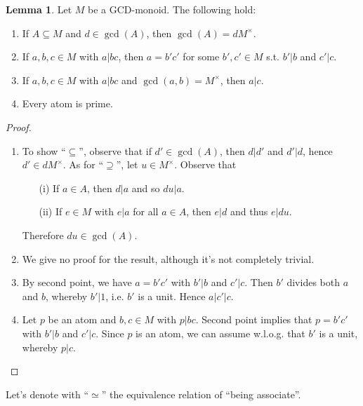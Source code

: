 \documentclass[12pt,a4paper]{report}
\theoremstyle{definition}
\newtheorem{lemma}[theorem]{Lemma}
\theoremstyle{num.custom-title}
\DeclareMathOperator{\sse}{\subseteq}
\begin{document}
\begin{lemma}\label{lemma_gcd-monoid}
Let $M$ be a GCD-monoid. The following hold:
\begin{enumerate}
\item If $A \sse M$ and $d \in \gcd(A)$, then $\gcd(A)=dM^\times$.
\item If $a,b,c \in M$ with $a|bc$, then $a=b'c'$ for some $b',c' \in M$ s.t. $b'|b$ and $c'|c$.
\item If $a,b,c \in M$ with $a|bc$ and $\gcd(a,b)=M^\times$, then $a|c$.
\item Every atom is prime.
\end{enumerate}
\begin{proof}\ 
\begin{enumerate}
\item To show ``$\sse$'', observe that if $d' \in \gcd(A)$, then $d|d'$ and $d'|d$, hence $d' \in dM^\times$. As for ``$\supseteq$'', let $u \in M^\times$. Observe that
\begin{enumerate}
\item[(i)] If $a \in A$, then $d|a$ and so $du|a$.
\item[(ii)] If $e \in M$ with $e|a$ for all $a \in A$, then $e|d$ and thus $e|du$.
\end{enumerate}
Therefore $du \in \gcd(A)$.
\item We give no proof for the result, although it's not completely trivial.
\item By second point, we have $a=b'c'$ with $b'|b$ and $c'|c$. Then $b'$ divides both $a$ and $b$, whereby $b'|1$, i.e. $b'$ is a unit. Hence $a|c'|c$.
\item Let $p$ be an atom and $b,c \in M$ with $p|bc$. Second point implies that $p=b'c'$ with $b'|b$ and $c'|c$. Since $p$ is an atom, we can assume w.l.o.g. that $b'$ is a unit, whereby $p|c$.
\end{enumerate}
\end{proof}
\end{lemma}

Let's denote with ``$\simeq$'' the equivalence relation of ``being associate''.
\end{document}
